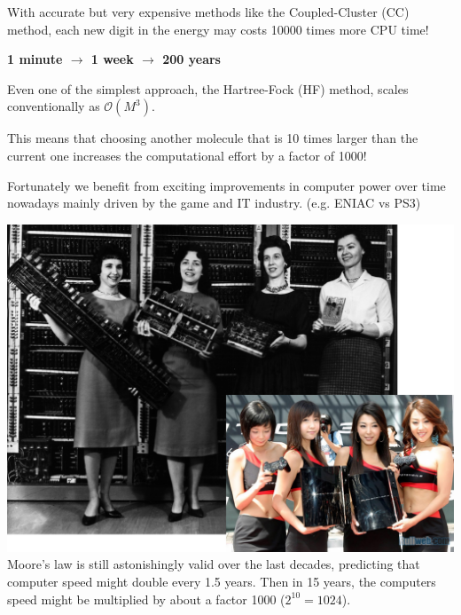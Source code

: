 \documentclass[portrait,kjemiDim,fontscale=0.292]{baposter}
\begin{document}
\begin{poster}
{%

With accurate but very expensive methods like the Coupled-Cluster (CC) method, each new digit in the energy may costs 10000 times more CPU time!

{\centering \textbf{{\color{green} 1 minute}  $\rightarrow$ {\color{orange} 1 week} $\longrightarrow$ {\color{red} 200 years}}}

 \vspace{1.25em}

Even one of the simplest approach, the Hartree-Fock (HF) method, scales conventionally as $\ensuremath{\mathcal{O}}(M^3)$.

This means that  choosing another molecule  that is 10 times larger than the current one increases the computational effort  by a factor of 1000!

 \vspace{1.25em}

Fortunately we benefit from  exciting improvements in  computer power over time nowadays mainly driven by the game and IT industry. (e.g. ENIAC vs PS3)

  \includegraphics[scale=0.1]{eniacWomen_PS3Koreans.png} \\

Moore's law is still astonishingly valid over the last decades, predicting that computer speed might double every 1.5 years. Then in 15 years, the computers speed might be multiplied by about a factor 1000 ($2^{10}=1024$).

 \vspace{1.25em}

}
\end{poster}
\end{document}
